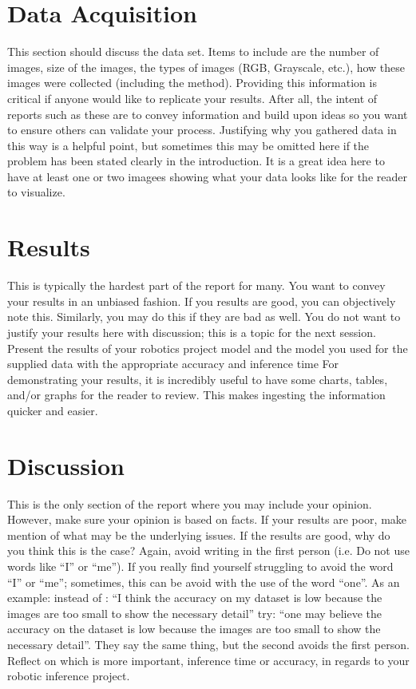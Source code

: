 \documentclass[10pt,journal,compsoc]{IEEEtran}
\begin{document}
\section{Data Acquisition}
This section should discuss the data set. Items to include are the number of images, size of the images, the types of images (RGB, Grayscale, etc.), how these images were collected (including the method). Providing this information is critical if anyone would like to replicate your results. After all, the intent of reports such as these are to convey information and build upon ideas so you want to ensure others can validate your process.
Justifying why you gathered data in this way is a helpful point, but sometimes this may be omitted here if the problem has been stated clearly in the introduction.
It is a great idea here to have at least one or two imagees showing what your data looks like for the reader to visualize.

\section{Results}
This is typically the hardest part of the report for many. You want to convey your results in an unbiased fashion. If you results are good, you can objectively note this. Similarly, you may do this if they are bad as well. You do not want to justify your results here with discussion; this is a topic for the next session. 
Present the results of your robotics project model and the model you used for the supplied data with the appropriate accuracy and inference time
For demonstrating your results, it is incredibly useful to have some charts, tables, and/or graphs for the reader to review. This makes ingesting the information quicker and easier.

\section{Discussion}
This is the only section of the report where you may include your opinion. However, make sure your opinion is based on facts. If your results are poor, make mention of what may be the underlying issues. If the results are good, why do you think this is the case? Again, avoid writing in the first person (i.e. Do not use words like “I” or “me”). If you really find yourself struggling to avoid the word “I” or “me”; sometimes, this can be avoid with the use of the word “one”. As an example: instead of : “I think the accuracy on my dataset is low because the images are too small to show the necessary detail” try: “one may believe the accuracy on the dataset is low because the images are too small to show the necessary detail”. They say the same thing, but the second avoids the first person. 
Reflect on which is more important, inference time or accuracy, in regards to your robotic inference project.
\end{document}
